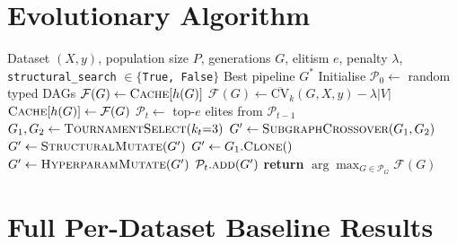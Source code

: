 \documentclass{article}
\theoremstyle{definition}
\theoremstyle{plain}
\theoremstyle{remark}
\begin{document}
\nocite{pedregosa2011scikit}
\nocite{wilcoxon1945individual}




\newpage
\appendix
\onecolumn

\section{Evolutionary Algorithm}
\label{app:alg}

\begin{algorithm}[H]
  \caption{C60.ai Evolutionary Search}
  \label{alg:c60}
  \begin{algorithmic}
     Dataset $(X, y)$, population size $P$,
      generations $G$, elitism $e$, penalty $\lambda$,
      \texttt{structural\_search} $\in \{$\texttt{True, False}$\}$
     Best pipeline $G^*$
    \STATE Initialise $\mathcal{P}_0 \leftarrow$ random typed DAGs
          \STATE $\mathcal{F}(G) \leftarrow \textsc{Cache}[h(G)]$
        \ELSE
          \STATE $\mathcal{F}(G) \leftarrow \overline{\mathrm{CV}}_k(G, X, y)
            - \lambda|V|$
          \STATE $\textsc{Cache}[h(G)] \leftarrow \mathcal{F}(G)$
        \ENDIF
      \ENDFOR
      \STATE $\mathcal{P}_t \leftarrow$ top-$e$ elites from
        $\mathcal{P}_{t-1}$ 
        \STATE $G_1, G_2 \leftarrow \textsc{TournamentSelect}(k_t{=}3)$
          \STATE $G' \leftarrow \textsc{SubgraphCrossover}(G_1, G_2)$
          \STATE $G' \leftarrow \textsc{StructuralMutate}(G')$
        \ELSE
          \STATE $G' \leftarrow G_1.\textsc{Clone}()$
        \ENDIF
        \STATE $G' \leftarrow \textsc{HyperparamMutate}(G')$
        \STATE $\mathcal{P}_t.\textsc{add}(G')$
      \ENDWHILE
    \ENDFOR
    \STATE \textbf{return} $\arg\max_{G \in \mathcal{P}_G} \mathcal{F}(G)$
  \end{algorithmic}
\end{algorithm}

\section{Full Per-Dataset Baseline Results}
\label{app:full-results}
\end{document}
